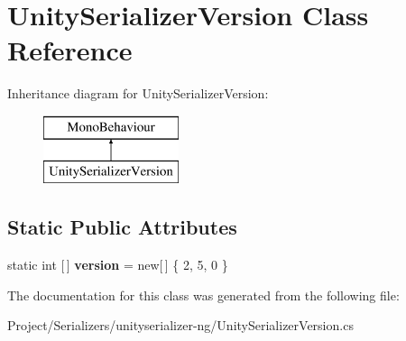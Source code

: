 \hypertarget{class_unity_serializer_version}{}\section{Unity\+Serializer\+Version Class Reference}
\label{class_unity_serializer_version}
Inheritance diagram for Unity\+Serializer\+Version\+:\begin{figure}[H]
\begin{center}
\leavevmode
\includegraphics[height=2.000000cm]{class_unity_serializer_version}
\end{center}
\end{figure}
\subsection*{Static Public Attributes}
\begin{DoxyCompactItemize}
\item 
\mbox{\label{class_unity_serializer_version_a96486ed1d2a8cc194977e71c0625a94b}} 
static int \mbox{[}$\,$\mbox{]} {\bfseries version} = new\mbox{[}$\,$\mbox{]} \{ 2, 5, 0 \}
\end{DoxyCompactItemize}


The documentation for this class was generated from the following file\+:\begin{DoxyCompactItemize}
\item 
Project/\+Serializers/unityserializer-\/ng/Unity\+Serializer\+Version.\+cs\end{DoxyCompactItemize}
